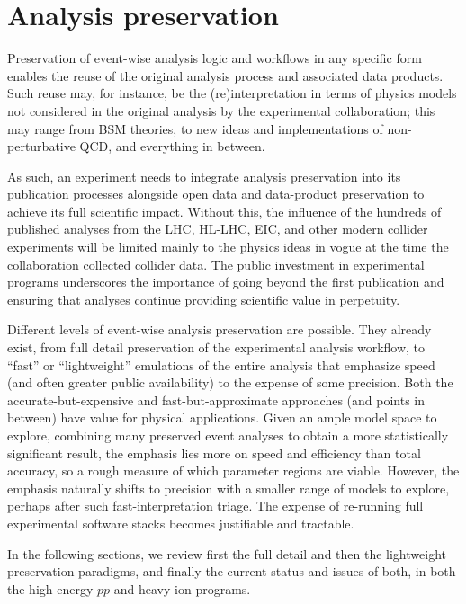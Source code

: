 \documentclass[11pt]{article}
\begin{document}
\section{Analysis preservation}
\label{sec:analysis-preservation}


Preservation of event-wise analysis logic and workflows in any specific form enables the reuse of the original analysis process and associated data products. Such reuse may, for instance, be the  (re)interpretation in terms of physics models not considered in the original analysis by the experimental collaboration; this may range from \gls{BSM} theories, to new ideas and implementations of non-perturbative \gls{QCD}, and everything in between.

As such, an experiment needs to integrate analysis preservation into its publication processes alongside open data and data-product preservation to achieve its full scientific impact. Without this, the influence of the hundreds of published analyses from the \gls{LHC}, \gls{HL-LHC}, \gls{EIC}, and other modern collider experiments will be limited mainly to the physics ideas in vogue at the time the collaboration collected collider data. The public investment in experimental programs underscores the importance of going beyond the first publication and ensuring that analyses continue providing scientific value in perpetuity.

Different levels of event-wise analysis preservation are possible.
They already exist, from full detail preservation of the experimental analysis workflow, to ``fast'' or ``lightweight'' emulations of the entire analysis that emphasize speed (and often greater public availability) to the expense of some precision.
Both the accurate-but-expensive and fast-but-approximate approaches (and points in between) have value for physical applications. Given an ample model space to explore, combining many preserved event analyses to obtain a more statistically significant result, the emphasis lies more on speed and efficiency than total accuracy, so a rough measure of which parameter regions are viable.
However, the emphasis naturally shifts to precision with a smaller range of models to explore, perhaps after such fast-interpretation triage.
The expense of re-running full experimental software stacks becomes justifiable and tractable.

In the following sections, we review first the full detail and then the lightweight preservation paradigms, and finally the current status and issues of both, in both the high-energy $pp$ and heavy-ion programs.
\end{document}

